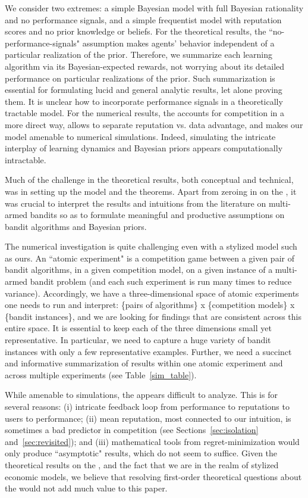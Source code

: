 We consider two extremes: a simple Bayesian model with full Bayesian rationality and no performance signals, and a simple frequentist model with reputation scores and no prior knowledge or beliefs. For the theoretical results, the ``no-performance-signals" assumption makes agents' behavior independent of a particular realization of the prior. Therefore, we summarize each learning algorithm via its Bayesian-expected rewards, not worrying about its detailed performance on particular realizations of the prior. Such summarization is essential for formulating lucid and general analytic results, let alone proving them. It is unclear how to incorporate performance signals in a theoretically tractable model. For the numerical results, the \ExptsModel accounts for competition in a more direct way, allows to separate reputation vs. data advantage, and makes our model amenable to numerical simulations. Indeed, simulating the intricate interplay of learning dynamics and Bayesian priors appears computationally intractable.

Much of the challenge in the theoretical results, both conceptual and technical, was in setting up the model and the theorems. Apart from zeroing in on the \TheoryModel, it was crucial to interpret the results and intuitions from the literature on multi-armed bandits so as to formulate meaningful and productive assumptions on bandit algorithms and Bayesian priors.

The numerical investigation is quite challenging even with a stylized model such as ours. An ``atomic experiment" is a competition game between a given pair of bandit algorithms, in a given competition model, on a given instance of a multi-armed bandit problem (and each such experiment is run many times to reduce variance).
Accordingly, we have a three-dimensional space of atomic experiments one needs to run and interpret: \{pairs of algorithms\} x \{competition models\} x \{bandit instances\}, and we are looking for findings that are consistent across this entire space. It is essential to keep each of the three dimensions small yet representative. In particular, we need to capture a huge variety of bandit instances with only a few representative examples. Further, we need a succinct and informative summarization of results within one atomic experiment and across multiple experiments (\eg see Table~\ref{sim_table}).


While amenable to simulations, the \ExptsModel appears difficult to analyze. This is for several reasons:
%
(i) intricate feedback loop from performance to reputations to users to performance;
%
(ii) mean reputation, most connected to our intuition, is sometimes a bad predictor in competition (see Sections~\ref{sec:isolation} and~\ref{sec:revisited}); and
%
(iii)
mathematical tools from regret-minimization would only produce ``asymptotic" results, which do not seem to suffice. Given the theoretical results on the \TheoryModel, and the fact that we are in the realm of stylized economic models, we believe that resolving first-order theoretical questions about the \ExptsModel would not add much value to this paper.



